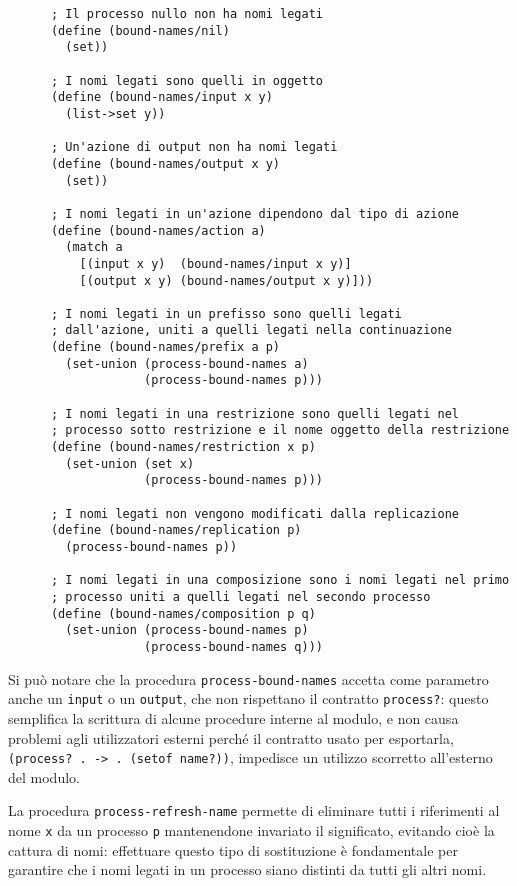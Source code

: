 \begin{lstlisting}
      ; Il processo nullo non ha nomi legati
      (define (bound-names/nil)
        (set))

      ; I nomi legati sono quelli in oggetto
      (define (bound-names/input x y)
        (list->set y))

      ; Un'azione di output non ha nomi legati
      (define (bound-names/output x y)
        (set))

      ; I nomi legati in un'azione dipendono dal tipo di azione
      (define (bound-names/action a)
        (match a
          [(input x y)  (bound-names/input x y)]
          [(output x y) (bound-names/output x y)]))

      ; I nomi legati in un prefisso sono quelli legati
      ; dall'azione, uniti a quelli legati nella continuazione
      (define (bound-names/prefix a p)
        (set-union (process-bound-names a)
                   (process-bound-names p)))

      ; I nomi legati in una restrizione sono quelli legati nel
      ; processo sotto restrizione e il nome oggetto della restrizione
      (define (bound-names/restriction x p)
        (set-union (set x)
                   (process-bound-names p)))

      ; I nomi legati non vengono modificati dalla replicazione
      (define (bound-names/replication p)
        (process-bound-names p))

      ; I nomi legati in una composizione sono i nomi legati nel primo
      ; processo uniti a quelli legati nel secondo processo
      (define (bound-names/composition p q)
        (set-union (process-bound-names p)
                   (process-bound-names q)))
\end{lstlisting}

Si pu\`o notare che la procedura \lstinline{process-bound-names} accetta
come parametro anche un \lstinline{input} o un \lstinline{output}, che
non rispettano il contratto \lstinline{process?}: questo semplifica la
scrittura di alcune procedure interne al modulo, e non causa problemi
agli utilizzatori esterni perch\'e il contratto usato per esportarla,
\lstinline{(process? . -> . (setof name?))}, impedisce un utilizzo scorretto
all'esterno del modulo.

La procedura \lstinline{process-refresh-name} permette di eliminare tutti
i riferimenti al nome \lstinline{x} da un processo \lstinline{p}
mantenendone invariato il significato, evitando cio\`e la cattura di nomi:
effettuare questo tipo di sostituzione \`e fondamentale per garantire che
i nomi legati in un processo siano distinti da tutti gli altri nomi.


